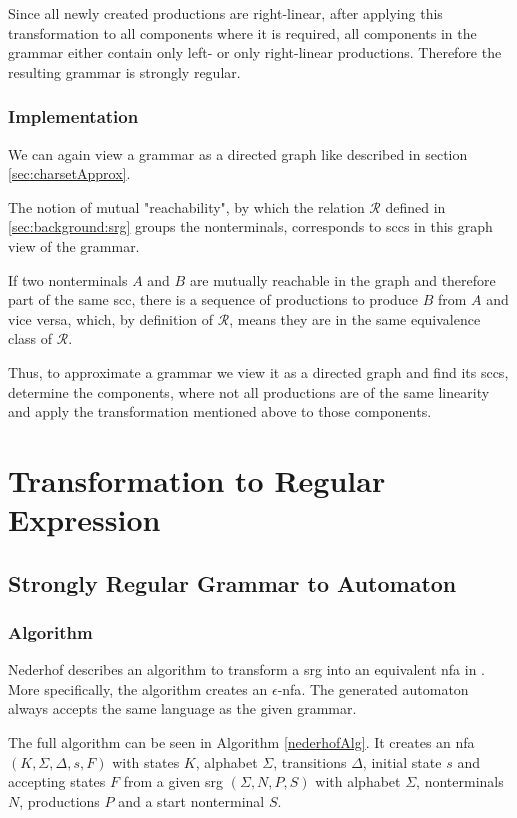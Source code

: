 Since all newly created productions are right-linear, after applying this transformation to all components where it is required, all components in the grammar either contain only left- or only right-linear productions. Therefore the resulting grammar is strongly regular.

\subsubsection{Implementation}

We can again view a grammar as a directed graph like described in section \ref{sec:charsetApprox}.

The notion of mutual "reachability", by which the relation $\mathcal{R}$ defined in \ref{sec:background:srg} groups the nonterminals, corresponds to \acp{scc} in this graph view of the grammar.

If two nonterminals $A$ and $B$ are mutually reachable in the graph and therefore part of the same \ac{scc}, there is a sequence of productions to produce $B$ from $A$ and vice versa, which, by definition of $\mathcal{R}$, means they are in the same equivalence class of $\mathcal{R}$.

Thus, to approximate a grammar we view it as a directed graph and find its \acp{scc}, determine the components, where not all productions are of the same linearity and apply the transformation mentioned above to those components.


\section{Transformation to Regular Expression}

\subsection{Strongly Regular Grammar to Automaton}\label{sec:nederhofAlgorithm}

\subsubsection{Algorithm}

Nederhof describes an algorithm to transform a \ac{srg} into an equivalent \ac{nfa} in \cite{nederhof}.
More specifically, the algorithm creates an $\epsilon$-\ac{nfa}. The generated automaton always accepts the same language as the given grammar.

The full algorithm can be seen in Algorithm \ref{nederhofAlg}. It creates an \ac{nfa} $(K,\Sigma, \Delta, s, F)$ with states $K$, alphabet $\Sigma$, transitions $\Delta$, initial state $s$ and accepting states $F$ from a given \ac{srg} $(\Sigma, N, P, S)$ with alphabet $\Sigma$, nonterminals $N$, productions $P$ and a start nonterminal $S$.

